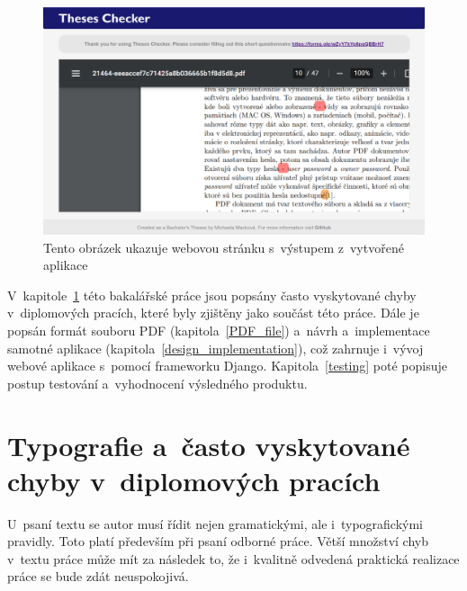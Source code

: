 \begin{figure}[H]
    \centering
    \includegraphics[width=\linewidth]{obrazky-figures/screenshot-page2.png}
    \caption{Tento obrázek ukazuje webovou stránku s~výstupem z~vytvořené aplikace}
    \label{pic_theses_checker_page2}
\end{figure}

V~kapitole~\ref{frequent_mistakes} této bakalářské práce jsou popsány často 
vyskytované chyby
v~diplomových pracích, které byly zjištěny jako součást této práce. Dále je
popsán formát souboru PDF (kapitola~\ref{PDF_file}) a~návrh a~implementace samotné
aplikace (kapitola~\ref{design_implementation}), což zahrnuje i~vývoj webové
aplikace s~pomocí frameworku Django. Kapitola~\ref{testing} poté popisuje postup
testování a~vyhodnocení výsledného produktu.






\chapter{Typografie a~často vyskytované chyby v~diplomových pracích} \label{frequent_mistakes}
U~psaní textu se autor musí řídit nejen gramatickými, ale i~typografickými
pravidly. Toto platí především při psaní odborné práce. Větší množství chyb
v~textu práce může mít za následek to, že i~kvalitně odvedená praktická realizace
práce se bude zdát neuspokojivá.

